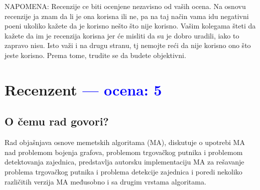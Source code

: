 \documentclass[a4paper]{report}
\newcommand{\odgovor}[1]{\textcolor{blue}{#1}}
\begin{document}
NAPOMENA: Recenzije ce biti ocenjene nezavisno od vaših ocena. Na osnovu recenzije ja znam da li je ona korisna ili ne, pa na taj način vama idu negativni poeni ukoliko kažete
 da je korisno nešto što nije korisno. Vašim kolegama šteti da kažete da im je recenzija korisna jer će misliti da su je dobro uradili, iako to zapravo nisu. Isto važi i na 
 drugu stranu, tj nemojte reći da nije korisno ono što jeste korisno. Prema tome, trudite se da budete objektivni. 
 
 
 
 \chapter{Recenzent \odgovor{--- ocena: 5} }


\section{O čemu rad govori?}
Rad objašnjava osnove memetskih algoritama (MA), diskutuje o upotrebi MA nad problemom bojenja grafova, problemom trgovačkog putnika i problemom detektovanja zajednica,
 predstavlja autorsku implementaciju MA za rešavanje problema trgovačkog putnika i problema detekcije zajednica i poredi nekoliko različitih verzija MA međusobno i sa drugim
 vrstama algoritama. 
\end{document}

